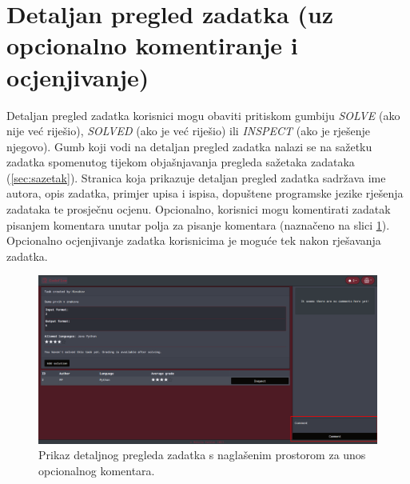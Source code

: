 \documentclass[times, utf8, zavrsni]{fer}
\begin{document}
		\section{Detaljan pregled zadatka (uz opcionalno komentiranje i ocjenjivanje)}
		Detaljan pregled zadatka korisnici mogu obaviti pritiskom gumbiju \textit{SOLVE} (ako nije već riješio), \textit{SOLVED} (ako je već riješio) ili \textit{INSPECT} (ako je rješenje njegovo). Gumb koji vodi na detaljan pregled zadatka nalazi se na sažetku zadatka spomenutog tijekom objašnjavanja pregleda sažetaka zadataka (\ref{sec:sazetak}). Stranica koja prikazuje detaljan pregled zadatka sadržava ime autora, opis zadatka, primjer upisa i ispisa, dopuštene programske jezike rješenja zadataka te prosječnu ocjenu. Opcionalno, korisnici mogu komentirati zadatak pisanjem komentara unutar polja za pisanje komentara (naznačeno na slici \ref{fig:detaljanpregled}). Opcionalno ocjenjivanje zadatka korisnicima je moguće tek nakon rješavanja zadatka.
		\begin{figure}[htb]
			\centering
			\includegraphics[width=\linewidth]{pictures/koristenje/DetaljanPregledZadatka.png}
			\caption{Prikaz detaljnog pregleda zadatka s naglašenim prostorom za unos opcionalnog komentara.}
			\label{fig:detaljanpregled}
		\end{figure}
	
\end{document}
